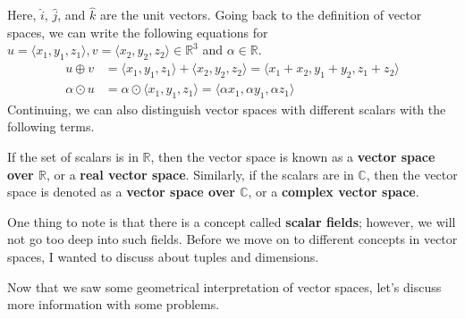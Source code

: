 \documentclass[../../main.tex]{subfiles}
\begin{document}
Here, $\hat{i}$, $\hat{j}$, and $\hat{k}$ are the unit vectors.
Going back to the definition of vector spaces, we can write the
following equations for $u = \langle x_1, y_1, z_1 \rangle,
v = \langle x_2, y_2, z_2 \rangle \in \mathbb{R}^3$ and $\alpha
\in \mathbb{R}$.
\begin{align*}
    u \oplus v
    &= \langle x_1, y_1, z_1 \rangle + \langle x_2, y_2, z_2 \rangle
    = \langle x_1 + x_2, y_1 + y_2, z_1 + z_2 \rangle \\
    \alpha \odot u
    &= \alpha \odot \langle x_1, y_1, z_1 \rangle
    = \langle \alpha x_1, \alpha y_1, \alpha z_1 \rangle
\end{align*}
Continuing, we can also distinguish vector spaces with different
scalars with the following terms.

\begin{definition}{}{}
If the set of scalars is in $\mathbb{R}$, then the vector space
is known as a \textbf{vector space over $\mathbb{R}$}, or a
\textbf{real vector space}. Similarly, if the scalars are in
$\mathbb{C}$, then the vector space is denoted as a
\textbf{vector space over $\mathbb{C}$}, or a \textbf{complex vector
space}.
\end{definition}

One thing to note is that there is a concept called \textbf{scalar
fields}; however, we will not go too deep into such fields.
Before we move on to different concepts in vector spaces, I wanted
to discuss about tuples and dimensions.

Now that we saw some geometrical interpretation of vector spaces,
let's discuss more information with some problems.
\end{document}
